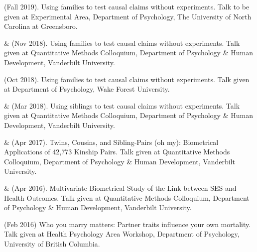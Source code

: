 
\item\meb (Fall 2019). Using families to test causal claims without experiments. Talk to be given at Experimental Area, Department of Psychology, The University of North Carolina at Greensboro. 

\item\meb \& \Joe (Nov 2018). Using families to test causal claims without experiments. Talk given at Quantitative Methods Colloquium, Department of Psychology \& Human Development, Vanderbilt University. 
\item\meb (Oct 2018). Using families to test causal claims without experiments. Talk given at Department of Psychology, Wake Forest University. 
\item\meb \& \Joe (Mar 2018). Using siblings to test causal claims without experiments. Talk given at Quantitative Methods Colloquium, Department of Psychology \& Human Development, Vanderbilt University. 
\item\meb \& \Joe (Apr 2017). Twins, Cousins, and Sibling-Pairs (oh my): Biometrical Applications of 42,773 Kinship Pairs. Talk given at Quantitative Methods Colloquium, Department of Psychology \& Human Development, Vanderbilt University. \href{https://osf.io/uyqwd/}{\color{blue}{https://osf.io/uyqwd/}}
\item\meb \& \Joe (Apr 2016). Multivariate Biometrical Study of the Link between SES and Health Outcomes. Talk given at Quantitative Methods Colloquium, Department of Psychology \& Human Development, Vanderbilt University.
\item \meb (Feb 2016) Who you marry matters: Partner traits influence your own mortality. Talk given at Health Psychology Area Workshop, Department of Psychology, University of British Columbia. \href{https://osf.io/jbf96/}{\color{blue}{https://osf.io/jbf96/}}
